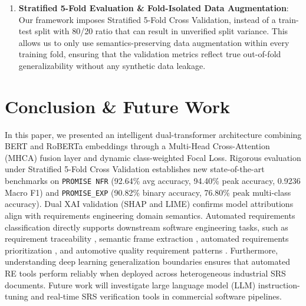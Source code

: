 \documentclass[11pt,a4paper]{article}
\begin{document}
\begin{enumerate}
    \item \textbf{Stratified 5-Fold Evaluation \& Fold-Isolated Data Augmentation}: Our framework imposes Stratified 5-Fold Cross Validation, instead of a train-test split with 80/20 ratio that can result in unverified split variance. This allows us to only use semantics-preserving data augmentation within every training fold, ensuring that the validation metrics reflect true out-of-fold generalizability without any synthetic data leakage.
\end{enumerate}

\section{Conclusion & Future Work}\label{sec:conclusion}
In this paper, we presented an intelligent dual-transformer architecture combining BERT and RoBERTa embeddings through a Multi-Head Cross-Attention (MHCA) fusion layer and dynamic class-weighted Focal Loss. Rigorous evaluation under Stratified 5-Fold Cross Validation establishes new state-of-the-art benchmarks on \texttt{PROMISE NFR} (92.64\% avg accuracy, 94.40\% peak accuracy, 0.9236 Macro F1) and \texttt{PROMISE\_EXP} (90.82\% binary accuracy, 76.80\% peak multi-class accuracy). Dual XAI validation (SHAP and LIME) confirms model attributions align with requirements engineering domain semantics. Automated requirements classification directly supports downstream software engineering tasks, such as requirement traceability \cite{niu2012enhancing}, semantic frame extraction \cite{alhoshan2021semantic}, automated requirements prioritization \cite{perini2013machine}, and automotive quality requirement patterns \cite{knauss2012quality}. Furthermore, understanding deep learning generalization boundaries \cite{zhang2017understanding} ensures that automated RE tools perform reliably when deployed across heterogeneous industrial SRS documents. Future work will investigate large language model (LLM) instruction-tuning and real-time SRS verification tools in commercial software pipelines.


\nocite{*}

\end{document}
